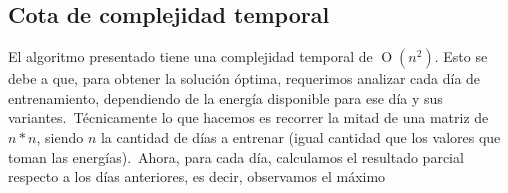 \subsection{Cota de complejidad temporal}

El algoritmo presentado tiene una complejidad temporal de $\operatorname{O}(n^2)$.
Esto se debe a que, para obtener la solución óptima, requerimos analizar cada día de entrenamiento, dependiendo de la energía disponible
para ese día y sus variantes.\
Técnicamente lo que hacemos es recorrer la mitad de una matriz de $n*n$, siendo $n$ la cantidad de días a entrenar (igual cantidad que
los valores que toman las energías).\
Ahora, para cada día, calculamos el resultado parcial respecto a los días anteriores, es decir, observamos el máximo 